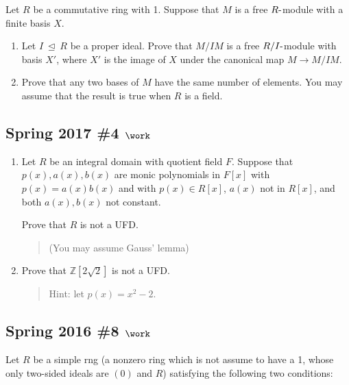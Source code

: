 Let \(R\) be a commutative ring with 1. Suppose that \(M\) is a free
\(R{\hbox{-}}\)module with a finite basis \(X\).

\begin{enumerate}
\def\labelenumi{\alph{enumi}.}
\item
  Let \(I {~\trianglelefteq~}R\) be a proper ideal. Prove that \(M/IM\)
  is a free \(R/I{\hbox{-}}\)module with basis \(X'\), where \(X'\) is
  the image of \(X\) under the canonical map \(M\to M/IM\).
\item
  Prove that any two bases of \(M\) have the same number of elements.
  You may assume that the result is true when \(R\) is a field.
\end{enumerate}

\hypertarget{spring-2017-4-work}{%
\subsection{\texorpdfstring{Spring 2017 \#4
\(\work\)}{Spring 2017 \#4 \textbackslash work}}\label{spring-2017-4-work}}

\begin{enumerate}
\def\labelenumi{\alph{enumi}.}
\item
  Let \(R\) be an integral domain with quotient field \(F\). Suppose
  that \(p(x), a(x), b(x)\) are monic polynomials in \(F[x]\) with
  \(p(x) = a(x) b(x)\) and with \(p(x) \in R[x]\), \(a(x)\) not in
  \(R[x]\), and both \(a(x), b(x)\) not constant.

  Prove that \(R\) is not a UFD.

  \begin{quote}
  (You may assume Gauss' lemma)
  \end{quote}
\item
  Prove that \({\mathbb{Z}}[2\sqrt{2}]\) is not a UFD.

  \begin{quote}
  Hint: let \(p(x) = x^2-2\).
  \end{quote}
\end{enumerate}

\hypertarget{spring-2016-8-work}{%
\subsection{\texorpdfstring{Spring 2016 \#8
\(\work\)}{Spring 2016 \#8 \textbackslash work}}\label{spring-2016-8-work}}

Let \(R\) be a simple rng (a nonzero ring which is not assume to have a
1, whose only two-sided ideals are \((0)\) and \(R\)) satisfying the
following two conditions:

